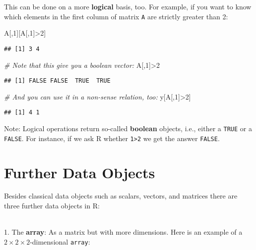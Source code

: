 \documentclass[
]{book}
\newenvironment{Shaded}{\begin{snugshade}}{\end{snugshade}}
\newcommand{\CommentTok}[1]{\textcolor[rgb]{0.56,0.35,0.01}{\textit{#1}}}
\newcommand{\DecValTok}[1]{\textcolor[rgb]{0.00,0.00,0.81}{#1}}
\newcommand{\NormalTok}[1]{#1}
\newcommand{\SpecialCharTok}[1]{\textcolor[rgb]{0.00,0.00,0.00}{#1}}
\begin{document}
This can be done on a more \textbf{logical} basis, too. For example, if you want to know which elements in the first column of matrix \texttt{A} are strictly greater than 2:

\begin{Shaded}
\begin{Highlighting}[]
\NormalTok{A[,}\DecValTok{1}\NormalTok{][A[,}\DecValTok{1}\NormalTok{]}\SpecialCharTok{\textgreater{}}\DecValTok{2}\NormalTok{]}
\end{Highlighting}
\end{Shaded}

\begin{verbatim}
## [1] 3 4
\end{verbatim}

\begin{Shaded}
\begin{Highlighting}[]
\CommentTok{\# Note that this give you a boolean vector:}
\NormalTok{A[,}\DecValTok{1}\NormalTok{]}\SpecialCharTok{\textgreater{}}\DecValTok{2}
\end{Highlighting}
\end{Shaded}

\begin{verbatim}
## [1] FALSE FALSE  TRUE  TRUE
\end{verbatim}

\begin{Shaded}
\begin{Highlighting}[]
\CommentTok{\# And you can use it in a non{-}sense relation, too:}
\NormalTok{y[A[,}\DecValTok{1}\NormalTok{]}\SpecialCharTok{\textgreater{}}\DecValTok{2}\NormalTok{]}
\end{Highlighting}
\end{Shaded}

\begin{verbatim}
## [1] 4 1
\end{verbatim}

Note: Logical operations return so-called \textbf{boolean} objects, i.e., either a \texttt{TRUE} or a \texttt{FALSE}. For instance, if we ask R whether \texttt{1\textgreater{}2} we get the answer \texttt{FALSE}.

\hypertarget{further-data-objects}{%
\section{Further Data Objects}\label{further-data-objects}}

Besides classical data objects such as scalars, vectors, and matrices there are three further data objects in R:\\
\strut \\
1. The \textbf{array}: As a matrix but with more dimensions. Here is an example of a \(2\times 2\times 2\)-dimensional \texttt{array}:
\end{document}
